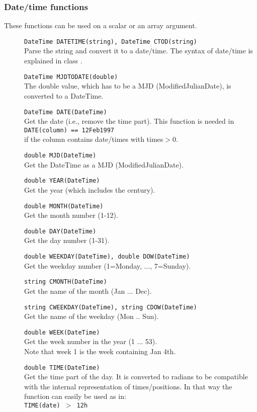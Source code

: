 \subsubsection{Date/time functions}
These functions can be used on a scalar or an array argument.
\begin{description}
  \item[] \texttt{DateTime DATETIME(string),  DateTime CTOD(string)}\\
       Parse the string and convert it to a date/time. The syntax of
       date/time is explained in class
       .
  \item[] \texttt{DateTime MJDTODATE(double)}\\
       The double value, which has to be a MJD (ModifiedJulianDate), is
       converted to a DateTime.
  \item[] \texttt{DateTime DATE(DateTime)}\\
        Get the date (i.e., remove the time part). This function is needed in
       \\\texttt{DATE(column) == 12Feb1997}
       \\if the column contains date/times with times$>$0.
  \item[] \texttt{double MJD(DateTime)}\\
        Get the DateTime as a MJD (ModifiedJulianDate).
  \item[] \texttt{double YEAR(DateTime)}\\
        Get the year (which includes the century).
  \item[] \texttt{double MONTH(DateTime)}\\
        Get the month number (1-12).
  \item[] \texttt{double DAY(DateTime)}\\
        Get the day number (1-31).
  \item[] \texttt{double WEEKDAY(DateTime),  double DOW(DateTime)}\\
        Get the weekday number (1=Monday, ..., 7=Sunday).
  \item[] \texttt{string CMONTH(DateTime)}\\
        Get the name of the month (Jan ... Dec).
  \item[] \texttt{string CWEEKDAY(DateTime),  string CDOW(DateTime)}\\
        Get the name of the weekday (Mon .. Sun).
  \item[] \texttt{double WEEK(DateTime)}\\
        Get the week number in the year (1 ... 53).
        \\Note that week 1 is the week containing Jan 4th.
  \item[] \texttt{double TIME(DateTime)}\\
       Get the time part of the day. It is converted to radians to
       be compatible with the internal representation of times/positions.
       In that way the function can easily be used as in:
       \\\texttt{TIME(date) $>$ 12h}
\end{description}
